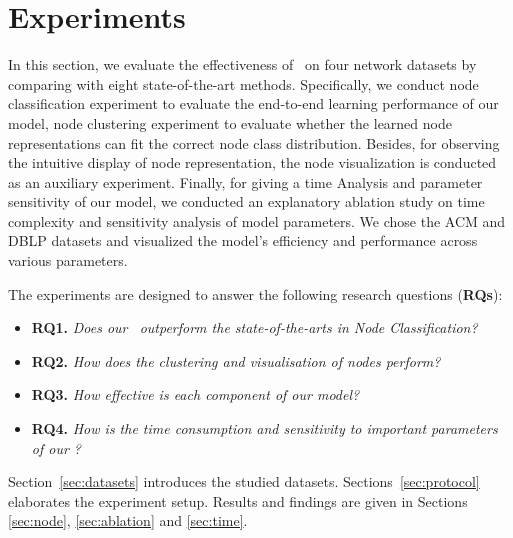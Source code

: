 \section{{\bf Experiments}}
\label{sec:experiments}

%
In this section, we evaluate the effectiveness of \alg~on four network datasets by comparing with eight state-of-the-art methods. 
%
Specifically, we conduct node classification experiment to evaluate the end-to-end learning performance of our model, node clustering experiment to evaluate whether the learned node representations can fit the correct node class distribution.
%
Besides, for observing the intuitive display of node representation, the node visualization is conducted as an auxiliary experiment.
%
Finally, for giving a time Analysis and parameter sensitivity of our model, we conducted an explanatory ablation study on time complexity and sensitivity analysis of model parameters. We chose the ACM and DBLP datasets and visualized the model's efficiency and performance across various parameters.

%
The experiments are designed to answer the following research questions ({\bf RQs}):
\begin{itemize}[leftmargin=*]
	\item \textbf{RQ1.} {\em Does our \alg\ outperform the state-of-the-arts in Node Classification?}
    \item \textbf{RQ2.} {\em How does the clustering and visualisation of nodes perform?}
	\item \textbf{RQ3.} {\em How effective is each component of our model?}
	\item \textbf{RQ4.} {\em How is the time consumption and sensitivity to important parameters of our \alg?}
\end{itemize}
Section~\ref{sec:datasets} introduces the studied datasets.
%
Sections~\ref{sec:protocol} elaborates the experiment setup.
%
Results and findings are given in Sections \ref{sec:node}, \ref{sec:ablation} and \ref{sec:time}.


